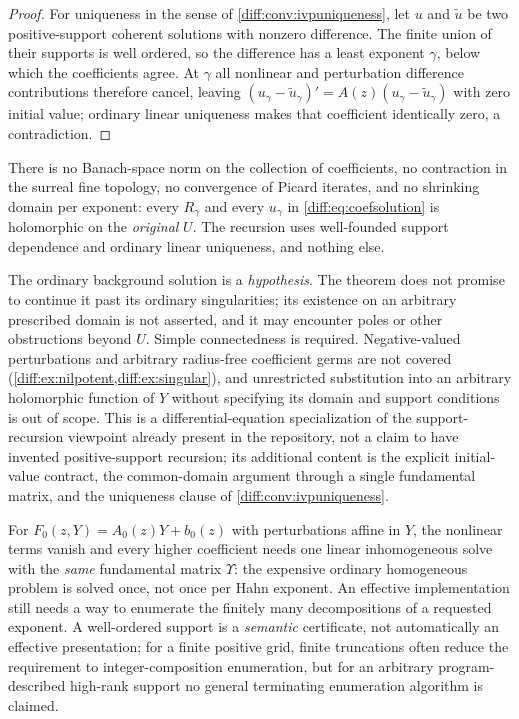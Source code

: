 \documentclass[11pt,letterpaper]{article}
\numberwithin{equation}{section}
\theoremstyle{definition}
\theoremstyle{remark}
\begin{document}
\begin{proof}
For uniqueness in the sense of \cref{diff:conv:ivpuniqueness}, let $u$ and
$\widetilde u$ be two positive-support coherent solutions with nonzero
difference. The finite union of their supports is well ordered, so the
difference has a least exponent $\gamma$, below which the coefficients agree.
At $\gamma$ all nonlinear and perturbation difference contributions therefore
cancel, leaving
$(u_{\gamma}-\widetilde u_{\gamma})'=A(z)(u_{\gamma}-\widetilde u_{\gamma})$
with zero initial value; ordinary linear uniqueness makes that coefficient
identically zero, a contradiction.
\end{proof}

\begin{warning}
\label{diff:warn:antibanach}
There is no Banach-space norm on the collection of coefficients, no
contraction in the surreal fine topology, no convergence of Picard iterates,
and no shrinking domain per exponent: every $R_{\gamma}$ and every
$u_{\gamma}$ in \cref{diff:eq:coefsolution} is holomorphic on the
\emph{original} $U$. The recursion uses well-founded support dependence and
ordinary linear uniqueness, and nothing else.

The ordinary background solution is a \emph{hypothesis}. The theorem does not
promise to continue it past its ordinary singularities; its existence on an
arbitrary prescribed domain is not asserted, and it may encounter poles or
other obstructions beyond $U$. Simple connectedness is required. Negative-valued
perturbations and arbitrary radius-free coefficient germs are not covered
(\cref{diff:ex:nilpotent,diff:ex:singular}), and unrestricted substitution into
an arbitrary holomorphic function of $Y$ without specifying its domain and
support conditions is out of scope. This is a differential-equation
specialization of the support-recursion viewpoint already present in the
repository, not a claim to have invented positive-support recursion; its
additional content is the explicit initial-value contract, the common-domain
argument through a single fundamental matrix, and the uniqueness clause of
\cref{diff:conv:ivpuniqueness}.
\end{warning}

\begin{remark}
\label{diff:rem:linearrule}
For $F_{0}(z,Y)=A_{0}(z)Y+b_{0}(z)$ with perturbations affine in $Y$, the
nonlinear terms vanish and every higher coefficient needs one linear
inhomogeneous solve with the \emph{same} fundamental matrix $\Upsilon$: the
expensive ordinary homogeneous problem is solved once, not once per Hahn
exponent. An effective implementation still needs a way to enumerate the
finitely many decompositions of a requested exponent. A well-ordered support is
a \emph{semantic} certificate, not automatically an effective presentation;
for a finite positive grid, finite truncations often reduce the requirement to
integer-composition enumeration, but for an arbitrary program-described
high-rank support no general terminating enumeration algorithm is claimed.
\end{remark}
\end{document}
